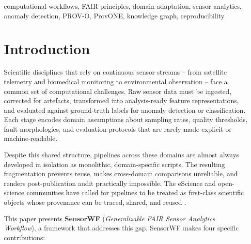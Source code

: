 \documentclass[conference]{IEEEtran}
\begin{document}
\begin{IEEEkeywords}
computational workflows, FAIR principles, domain adaptation, sensor analytics,
anomaly detection, PROV-O, ProvONE, knowledge graph, reproducibility
\end{IEEEkeywords}

\section{Introduction}
\label{sec:intro}

Scientific disciplines that rely on continuous sensor streams -- from satellite
telemetry and biomedical monitoring to environmental observation -- face a common
set of computational challenges. Raw sensor data must be ingested, corrected
for artefacts, transformed into analysis-ready feature representations, and
evaluated against ground-truth labels for anomaly detection or classification.
Each stage encodes domain assumptions about sampling rates, quality thresholds,
fault morphologies, and evaluation protocols that are rarely made explicit or
machine-readable.

Despite this shared structure, pipelines across these domains are almost always
developed in isolation as monolithic, domain-specific scripts. The resulting
fragmentation prevents reuse, makes cross-domain comparisons unreliable, and
renders post-publication audit practically impossible. The eScience and
open-science communities have called for pipelines to be treated as first-class
scientific objects whose provenance can be traced, shared, and reused
\cite{wilkinson2016fair,garijo2022fair}.

This paper presents \textbf{SensorWF} (\emph{Generalizable FAIR Sensor Analytics
Workflow}), a framework that addresses this gap. SensorWF makes four specific
contributions:
\end{document}
